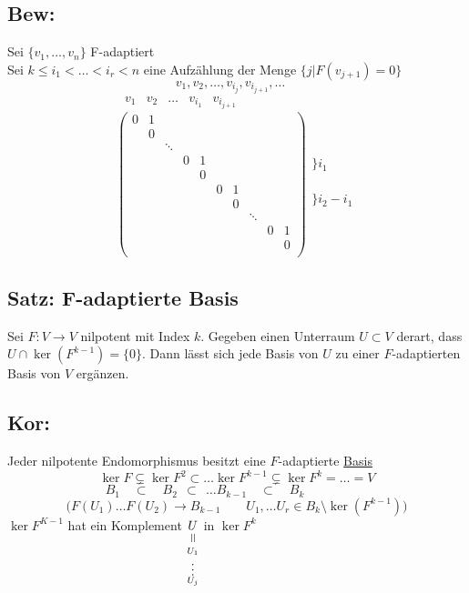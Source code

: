 \documentclass[titlepage,12pt,a4paper,ngerman]{report}
\newcommand{\verteq}{\rotatebox{90}{$\,=$}}
\newcommand{\equalto}[2]{\underset{\scriptstyle\overset{\mkern4mu\verteq}{#2}}{#1}}
\begin{document}
\subsection{Bew:}
Sei $  \{v_1,\dots,v_n\} $ F-adaptiert\\
Sei $ k \le i_1 < \dots < i_r < n $ eine Aufzählung der Menge $ \{j | F(v_{j+1})=0\} $
$$v_1,v_2,\dots,v_{i_j},v_{i_{j+1}}, \dots\quad $$
\pagebreak
$$ \begin{array}{rrrrrrrrrrrrrrrr}
v_1 & v_2 & \dots & v_{i_1} & v_{i_{j+1}} & & & & & & & & & & &
\end{array} $$
$$\begin{pmatrix}
0 & 1\\
& 0 \\
& & \ddots\\
& & & 0 & 1\\
& & & & 0\\
& & & & & 0 & 1\\
& & & & & & 0 \\
& & & & & & & \ddots\\
& & & & & & & & 0 & 1\\
& & & & & & & & & 0\\
\end{pmatrix} \begin{array}{l}
\\
\\
\bigg\} i_1\\
\\
\\
\\
\bigg\} i_2-i_1\\
\\
\\
\end{array}$$


\subsection{Satz: F-adaptierte Basis}
Sei $ F: V \to V  $ nilpotent mit Index $k$. Gegeben einen Unterraum $ U \subset V $ derart, dass $ U \cap \ker(F^{k-1}) = \{0\} $. Dann lässt sich jede Basis von $ U $ zu einer $ F $-adaptierten Basis von $ V $ ergänzen.

\subsection{Kor:}
Jeder nilpotente Endomorphismus besitzt eine $ F $-adaptierte \underline{Basis}
$$ \ker F \subsetneq \ker F^2 \subset \dots \ker F^{k-1} \subsetneq \ker F^k = \dots = V$$
$$ B_1 \quad \subset \quad  B_2 \ \ \subset \ \  \dots B_{k-1} \quad \subset \quad B_k \qquad \qquad \quad $$
$$\bigg(F(U_1) \dots F(U_2) \rightarrow B_{k-1} \qquad U_1, \dots U_r \in B_k \setminus \ker(F^{k-1}) \bigg)$$
$ \ker F^{K-1} $ hat ein Komplement $ \equalto{U}{\substack{U_1 \\ \vdots \\ U_j}}  $ in $ \ker F^k $
\end{document}
